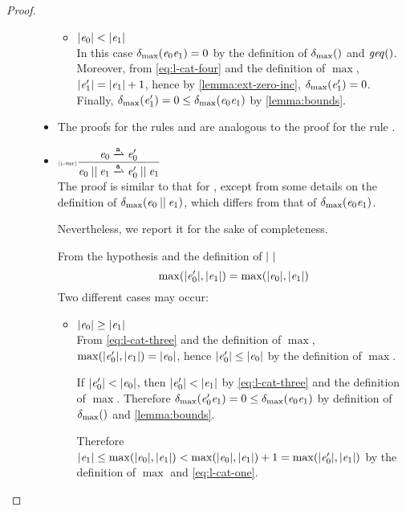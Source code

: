 \begin{proof}
\begin{description}
\begin{itemize}
\begin{itemize}
           \item ${\mid}{\mathit {e}_0}{\mid}<{\mid}{\mathit {e}_1}{\mid}$\\
                 In this case ${\delta_{\max}}({\mathit {e}_0\mathit {e}_1})=0$ by the definition of ${\delta_{\max}}({})$ and $\mathit{geq}()$. Moreover, from \cref{eq:l-cat-four} and the definition of $\max$, ${\mid}{\mathit {e}_1'}{\mid}={\mid}{\mathit {e}_1}{\mid}+1$, hence  by \cref{lemma:ext-zero-inc}, ${\delta_{\max}}({\mathit {e}_1'})=0$. Finally,
                 ${\delta_{\max}}({\mathit {e}_1'})=0\leq{\delta_{\max}}({\mathit {e}_0\mathit {e}_1})$ by \cref{lemma:bounds}.
          \end{itemize}

    \item The proofs for the rules  and  are analogous to the proof for the rule .
    \item $\Rule{l-shf}{\re_0\parDer{\sym}\re'_0}{\re_0\shuffleop\re_1\parDer{\sym}\re'_0\shuffleop\re_1}{}$\\[2ex]
          The proof is similar to that for , except from some details on the definition of ${\delta_{\max}}({\mathit {e}_0\mathbin{||}\mathit {e}_1})$, which differs from that of ${\delta_{\max}}({\mathit {e}_0\mathit {e}_1})$.

          Nevertheless, we report it for the sake of completeness.

          From the hypothesis and the definition of ${\mid}{\ }{\mid}$
          \begin{equation}
           \label{eq:l-cat-three}
           \max({\mid}{\mathit {e}_0'}{\mid},{\mid}{\mathit {e}_1}{\mid})=\max({\mid}{\mathit {e}_0}{\mid},{\mid}{\mathit {e}_1}{\mid})
          \end{equation}
          Two different cases may occur:
          \begin{itemize}
           \item ${\mid}{\mathit {e}_0}{\mid}\geq{\mid}{\ensuremath{\mathit {e}}_1}{\mid}$\\
                 From \cref{eq:l-cat-three} and the definition of $\max$, $\max({\mid}{\mathit {e}_0'}{\mid},{\mid}{\mathit {e}_1}{\mid})={\mid}{\mathit {e}_0}{\mid}$, hence ${\mid}{\mathit {e}_0'}{\mid}\leq{\mid}{\ensuremath{\mathit {e}}_0}{\mid}$ by the definition of $\max$.

                 If ${\mid}{\mathit {e}_0'}{\mid}<{\mid}{\mathit {e}_0}{\mid}$, then ${\mid}{\mathit {e}_0'}{\mid}<{\mid}{\mathit {e}_1}{\mid}$ by \cref{eq:l-cat-three} and the definition of $\max$. Therefore ${\delta_{\max}}({\mathit {e}_0'\mathit {e}_1})=0\leq{\delta_{\max}}({\mathit {e}_0\mathit {e}_1})$ by definition of ${\delta_{\max}}({})$ and \cref{lemma:bounds}.

                 Therefore ${\mid}{\mathit {e}_1}{\mid}\leq\max({\mid}{\mathit {e}_0}{\mid},{\mid}{\mathit {e}_1}{\mid})<\max({\mid}{\mathit {e}_0}{\mid},{\mid}{\mathit {e}_1}{\mid})+1=\max({\mid}{\mathit {e}_0'}{\mid},{\mid}{\mathit {e}_1}{\mid})$ by the definition of $\max$ and \cref{eq:l-cat-one}.


\end{itemize}
\end{itemize}
\end{description}
\end{proof}
